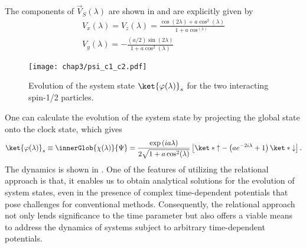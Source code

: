 The components of \(\vec{V}_S(\lambda)\) are shown in  and 
are explicitly given by 
\begin{equation}
    \begin{gathered}
        V_x(\lambda) = V_z(\lambda) = \frac{\cos(2\lambda) + a \cos^2(\lambda)}{1 + a\cos^(\lambda)}\\
        V_y(\lambda) = -\frac{(a/2)\sin(2\lambda)}{1 + a \cos^2(\lambda)}
    \end{gathered}
\end{equation}
\begin{figure}[!h]
    \centering
    \texttt{[image: chap3/psi\_c1\_c2.pdf]}
    \caption{Evolution of the system state \(\ket{\varphi(\lambda)}_s\) for the two interacting spin-1/2 particles. }
    \label{fig:2spin_interact_RQM}
\end{figure}


One can calculate the evolution of the system state by projecting the global state onto the clock state,
which gives
\begin{equation}
    \begin{gathered}
        \ket{\varphi(\lambda)}_s \equiv  \innerGlob{\chi(\lambda)}{\Psi} 
        = \frac{\exp\left(i a\lambda\right)}{
            2\sqrt{1 + a \cos^2(\lambda)}} \left[\ket*{\uparrow} - 
            \left(a e^{-2i\lambda} + 1\right)\ket*{\downarrow}\right] .
    \end{gathered}
\end{equation}
The dynamics is shown in . 
One of the features of utilizing the relational approach is that, 
it enables us to obtain analytical solutions for the evolution of system states, even in the presence of complex time-dependent potentials that pose challenges for conventional methods. Consequently, the relational approach not only lends significance to the time parameter but also offers a viable means to address the dynamics of systems subject to arbitrary time-dependent potentials.



\newpage